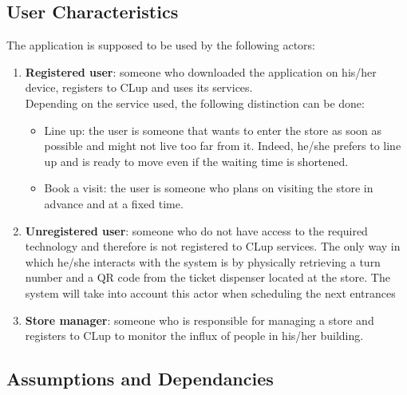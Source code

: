 \documentclass{article}
\begin{document}
\subsection{User Characteristics}
The application is supposed to be used by the following actors:
\begin{enumerate}
\item\textbf{Registered user}: someone who downloaded the application on his/her device, registers to CLup and uses its services.\medskip\\
Depending on the service used, the following distinction can be done: 
\begin{itemize}
\item Line up: the user is someone that wants to enter the store as soon as possible and might not live too far from it. Indeed, he/she prefers to line up and is ready to move even if the waiting time is shortened.
\item Book a visit: the user is someone who plans on visiting the store in advance and at a fixed time.
\end{itemize}
\item\textbf{Unregistered user}: someone who do not have access to the required technology and therefore is not registered to CLup services. The only way in which he/she interacts with the system is by physically retrieving a turn number and a QR code from the ticket dispenser located at the store. The system will take into account this actor when scheduling the next entrances
\item\textbf{Store manager}: someone who is responsible for managing a store and registers to CLup to monitor the influx of people in his/her building.
\end{enumerate}
\subsection{Assumptions and Dependancies}
\end{document}
